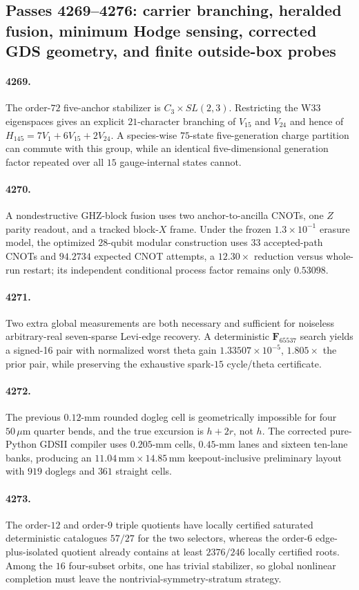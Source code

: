 \subsection*{Passes 4269--4276: carrier branching, heralded fusion, minimum Hodge sensing, corrected GDS geometry, and finite outside-box probes}
\paragraph{4269.} The order-$72$ five-anchor stabilizer is $C_3\times SL(2,3)$.  Restricting the W33 eigenspaces gives an explicit $21$-character branching of $V_{15}$ and $V_{24}$ and hence of $H_{145}=7V_1+6V_{15}+2V_{24}$.  A species-wise $75$-state five-generation charge partition can commute with this group, while an identical five-dimensional generation factor repeated over all $15$ gauge-internal states cannot.
\paragraph{4270.} A nondestructive GHZ-block fusion uses two anchor-to-ancilla CNOTs, one $Z$ parity readout, and a tracked block-$X$ frame.  Under the frozen $1.3\times10^{-1}$ erasure model, the optimized $28$-qubit modular construction uses $33$ accepted-path CNOTs and $94.2734$ expected CNOT attempts, a $12.30\times$ reduction versus whole-run restart; its independent conditional process factor remains only $0.53098$.
\paragraph{4271.} Two extra global measurements are both necessary and sufficient for noiseless arbitrary-real seven-sparse Levi-edge recovery.  A deterministic $\mathbf F_{65537}$ search yields a signed-16 pair with normalized worst theta gain $1.33507\times10^{-5}$, $1.805\times$ the prior pair, while preserving the exhaustive spark-$15$ cycle/theta certificate.
\paragraph{4272.} The previous $0.12$-mm rounded dogleg cell is geometrically impossible for four $50\,\mu$m quarter bends, and the true excursion is $h+2r$, not $h$.  The corrected pure-Python GDSII compiler uses $0.205$-mm cells, $0.45$-mm lanes and sixteen ten-lane banks, producing an $11.04\,\mathrm{mm}\times14.85\,\mathrm{mm}$ keepout-inclusive preliminary layout with $919$ doglegs and $361$ straight cells.
\paragraph{4273.} The order-$12$ and order-$9$ triple quotients have locally certified saturated deterministic catalogues $57/27$ for the two selectors, whereas the order-$6$ edge-plus-isolated quotient already contains at least $2376/246$ locally certified roots.  Among the $16$ four-subset orbits, one has trivial stabilizer, so global nonlinear completion must leave the nontrivial-symmetry-stratum strategy.
